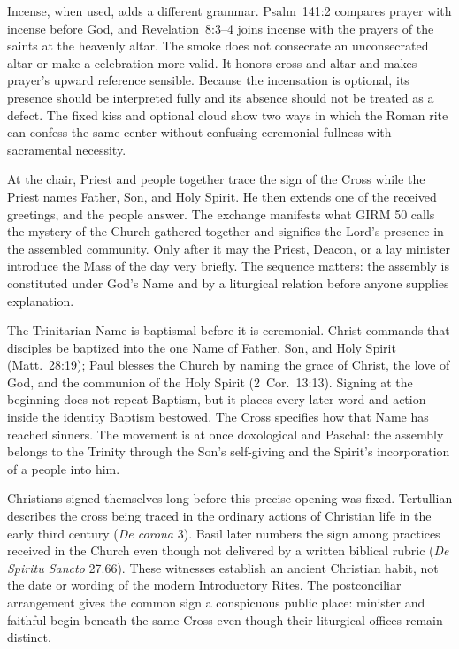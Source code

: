 Incense, when used, adds a different grammar. Psalm~141:2 compares prayer with incense before God, and Revelation~8:3--4 joins incense with the prayers of the saints at the heavenly altar. The smoke does not consecrate an unconsecrated altar or make a celebration more valid. It honors cross and altar and makes prayer's upward reference sensible. Because the incensation is optional, its presence should be interpreted fully and its absence should not be treated as a defect. The fixed kiss and optional cloud show two ways in which the Roman rite can confess the same center without confusing ceremonial fullness with sacramental necessity.


At the chair, Priest and people together trace the sign of the Cross while the Priest names Father, Son, and Holy Spirit. He then extends one of the received greetings, and the people answer. The exchange manifests what GIRM 50 calls the mystery of the Church gathered together and signifies the Lord's presence in the assembled community. Only after it may the Priest, Deacon, or a lay minister introduce the Mass of the day very briefly. The sequence matters: the assembly is constituted under God's Name and by a liturgical relation before anyone supplies explanation.

The Trinitarian Name is baptismal before it is ceremonial. Christ commands that disciples be baptized into the one Name of Father, Son, and Holy Spirit (Matt.~28:19); Paul blesses the Church by naming the grace of Christ, the love of God, and the communion of the Holy Spirit (2~Cor.~13:13). Signing at the beginning does not repeat Baptism, but it places every later word and action inside the identity Baptism bestowed. The Cross specifies how that Name has reached sinners. The movement is at once doxological and Paschal: the assembly belongs to the Trinity through the Son's self-giving and the Spirit's incorporation of a people into him.

Christians signed themselves long before this precise opening was fixed. Tertullian describes the cross being traced in the ordinary actions of Christian life in the early third century (\emph{De corona} 3). Basil later numbers the sign among practices received in the Church even though not delivered by a written biblical rubric (\emph{De Spiritu Sancto} 27.66). These witnesses establish an ancient Christian habit, not the date or wording of the modern Introductory Rites. The postconciliar arrangement gives the common sign a conspicuous public place: minister and faithful begin beneath the same Cross even though their liturgical offices remain distinct.

